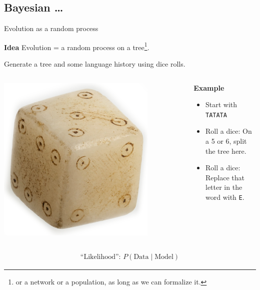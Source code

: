 \documentclass[9pt]{beamer}
\newcommand{\paragraph}[1]{\par{\bfseries #1}}
\begin{document}
\subsection{Bayesian …}
\begin{frame}{Evolution as a random process}
  \paragraph{Idea} Evolution = a random process on a tree\footnote{or a network or
    a population, as long as we can formalize it.}.

  Generate a tree and some language history using dice rolls.

  \pause
  \begin{columns}
    \begin{column}{0.4\textwidth}
      \begin{center}
        \includegraphics[width=0.8\textwidth]{dice.png}
      \end{center}
    \end{column}
    \begin{column}{0.6\textwidth}
      \paragraph{Example}
      \begin{itemize}
      \item Start with \texttt{TATATA}
      \item Roll a dice: On a 5 or 6, split the tree here.
      \item Roll a dice: Replace that letter in the word with \texttt{E}.
      \end{itemize}
    \end{column}
  \end{columns}
  \pause
  \begin{align}
    \text{“Likelihood”: }P(\text{Data} \mid \text{Model})
    \nonumber
  \end{align}
\end{frame}
\end{document}
